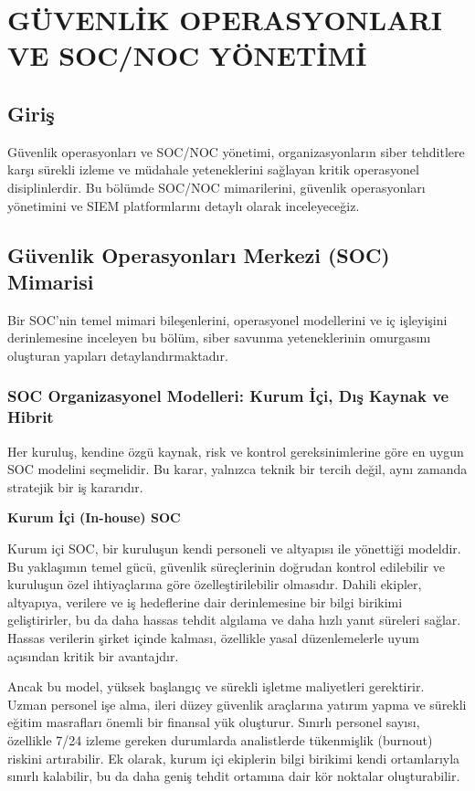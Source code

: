 ﻿\chapter{GÜVENLİK OPERASYONLARI VE SOC/NOC YÖNETİMİ}

\section*{Giriş}
Güvenlik operasyonları ve SOC/NOC yönetimi, organizasyonların siber tehditlere karşı sürekli izleme ve müdahale yeteneklerini sağlayan kritik operasyonel disiplinlerdir. Bu bölümde SOC/NOC mimarilerini, güvenlik operasyonları yönetimini ve SIEM platformlarını detaylı olarak inceleyeceğiz.

\section{Güvenlik Operasyonları Merkezi (SOC) Mimarisi}

Bir SOC'nin temel mimari bileşenlerini, operasyonel modellerini ve iç işleyişini derinlemesine inceleyen bu bölüm, siber savunma yeteneklerinin omurgasını oluşturan yapıları detaylandırmaktadır.

\subsection{SOC Organizasyonel Modelleri: Kurum İçi, Dış Kaynak ve Hibrit}

Her kuruluş, kendine özgü kaynak, risk ve kontrol gereksinimlerine göre en uygun SOC modelini seçmelidir. Bu karar, yalnızca teknik bir tercih değil, aynı zamanda stratejik bir iş kararıdır.

\textbf{Kurum İçi (In-house) SOC}

Kurum içi SOC, bir kuruluşun kendi personeli ve altyapısı ile yönettiği modeldir. Bu yaklaşımın temel gücü, güvenlik süreçlerinin doğrudan kontrol edilebilir ve kuruluşun özel ihtiyaçlarına göre özelleştirilebilir olmasıdır. Dahili ekipler, altyapıya, verilere ve iş hedeflerine dair derinlemesine bir bilgi birikimi geliştirirler, bu da daha hassas tehdit algılama ve daha hızlı yanıt süreleri sağlar. Hassas verilerin şirket içinde kalması, özellikle yasal düzenlemelerle uyum açısından kritik bir avantajdır.

Ancak bu model, yüksek başlangıç ve sürekli işletme maliyetleri gerektirir. Uzman personel işe alma, ileri düzey güvenlik araçlarına yatırım yapma ve sürekli eğitim masrafları önemli bir finansal yük oluşturur. Sınırlı personel sayısı, özellikle 7/24 izleme gereken durumlarda analistlerde tükenmişlik (burnout) riskini artırabilir. Ek olarak, kurum içi ekiplerin bilgi birikimi kendi ortamlarıyla sınırlı kalabilir, bu da daha geniş tehdit ortamına dair kör noktalar oluşturabilir.

